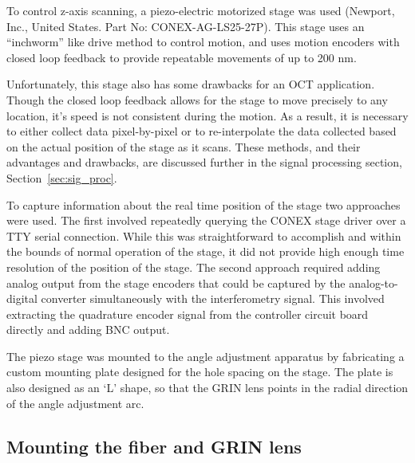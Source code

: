 To control z-axis scanning, a piezo-electric motorized stage was used (Newport, Inc., United States. Part No: CONEX-AG-LS25-27P). This stage uses an ``inchworm'' like drive method to control motion, and uses motion encoders with closed loop feedback to provide repeatable movements of up to 200 nm.

Unfortunately, this stage also has some drawbacks for an OCT application. Though the closed loop feedback allows for the stage to move precisely to any location, it's speed is not consistent during the motion. As a result, it is necessary to either collect data pixel-by-pixel or to re-interpolate the data collected based on the actual position of the stage as it scans. These methods, and their advantages and drawbacks, are discussed further in the signal processing section, Section~\ref{sec:sig_proc}.

To capture information about the real time position of the stage two approaches were used. The first involved repeatedly querying the CONEX stage driver over a TTY serial connection. While this was straightforward to accomplish and within the bounds of normal operation of the stage, it did not provide high enough time resolution of the position of the stage. The second approach required adding analog output from the stage encoders that could be captured by the analog-to-digital converter simultaneously with the interferometry signal. This involved extracting the quadrature encoder signal from the controller circuit board directly and adding BNC output.

The piezo stage was mounted to the angle adjustment apparatus by fabricating a custom mounting plate designed for the hole spacing on the stage. The plate is also designed as an `L' shape, so that the GRIN lens points in the radial direction of the angle adjustment arc.


\subsection{Mounting the fiber and GRIN lens}

